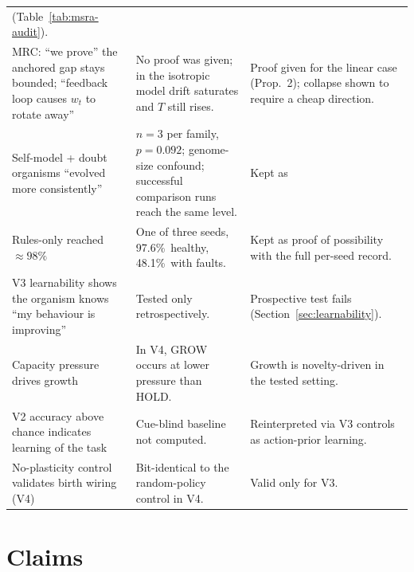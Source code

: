 \documentclass[11pt]{article}
\theoremstyle{remark}
\newcommand{\etag}[2]{\textsf{\scriptsize\textcolor{white}{\colorbox{#1}{\strut #2}}}}
\newcommand{\Sug}{\etag{tS}{SUGGESTIVE}}
\newcommand{\pct}{\%}
\begin{document}
\begin{longtable}{>{\raggedright\arraybackslash}p{5.2cm}>{\raggedright\arraybackslash}p{4.6cm}>{\raggedright\arraybackslash}p{4.8cm}}
(Table~\ref{tab:msra-audit}). \\
MRC: ``we prove'' the anchored gap stays bounded; ``feedback loop causes $w_t$ to rotate away'' & No proof was given;
in the isotropic model drift saturates and $T$ still rises. & Proof given for the linear case (Prop.~2); collapse
shown to require a cheap direction. \\
Self-model + doubt organisms ``evolved more consistently'' & $n=3$ per family, $p=0.092$; genome-size confound;
successful comparison runs reach the same level. & Kept as \Sug\ with all three caveats. \\
Rules-only reached ${\approx}98\pct$ & One of three seeds, 97.6\pct\ healthy, 48.1\pct\ with faults. & Kept as proof of
possibility with the full per-seed record. \\
V3 learnability shows the organism knows ``my behaviour is improving'' & Tested only retrospectively. &
Prospective test fails (Section~\ref{sec:learnability}). \\
Capacity pressure drives growth & In V4, GROW occurs at lower pressure than HOLD. & Growth is novelty-driven in
the tested setting. \\
V2 accuracy above chance indicates learning of the task & Cue-blind baseline not computed. & Reinterpreted via V3
controls as action-prior learning. \\
No-plasticity control validates birth wiring (V4) & Bit-identical to the random-policy control in V4. &
Valid only for V3. \\
\bottomrule
\end{longtable}
\endgroup

\section{Claims}
\label{sec:claims}
\end{document}
